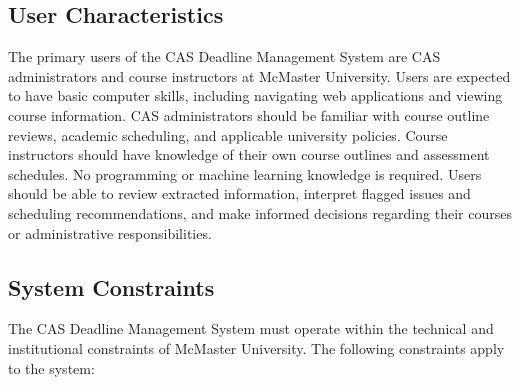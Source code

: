 \documentclass[12pt]{article}
\begin{document}
\subsection{User Characteristics} \label{SecUserCharacteristics}

The primary users of the CAS Deadline Management System are CAS administrators 
and course instructors at McMaster University. Users are expected to have basic 
computer skills, including navigating web applications and viewing course information. 
CAS administrators should be familiar with course outline reviews, academic scheduling, 
and applicable university policies. Course instructors should have knowledge of their own 
course outlines and assessment schedules. No programming or machine learning knowledge is 
required. Users should be able to review extracted information, interpret flagged issues 
and scheduling recommendations, and make informed decisions regarding their courses or 
administrative responsibilities.

\subsection{System Constraints}

The CAS Deadline Management System must operate within the technical and institutional 
constraints of McMaster University. The following constraints apply to the system:
\end{document}
